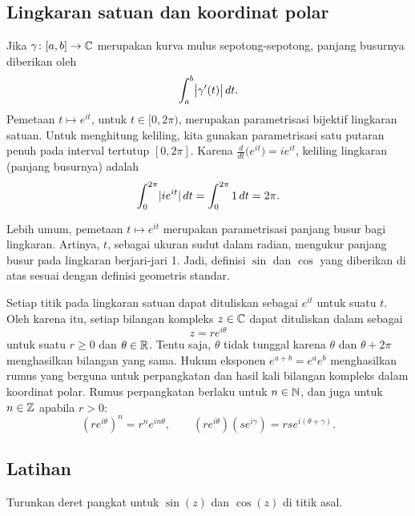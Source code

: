 \subsection{Lingkaran satuan dan koordinat polar}

Jika $\gamma \colon [a,b] \to {\mathbb{C}}$ merupakan kurva mulus sepotong-sepotong,
panjang busurnya diberikan oleh
\begin{equation*}
\int_a^b \bigl\lvert {\gamma'(t)} \bigr\rvert \, dt .
\end{equation*}
Pemetaan $t \mapsto e^{it}$, untuk $t \in [0,2\pi)$, merupakan parametrisasi
bijektif lingkaran satuan. Untuk menghitung keliling, kita gunakan parametrisasi
satu putaran penuh pada interval tertutup $[0,2\pi]$. Karena
$\frac{d}{dt} \bigl( e^{it} \bigr) = ie^{it}$, keliling
lingkaran (panjang busurnya) adalah
\begin{equation*}
\int_0^{2\pi} \lvert {i e^{it}} \rvert  \,  dt
=
\int_0^{2\pi} 1  \,  dt  = 2\pi .
\end{equation*}

Lebih umum, pemetaan $t \mapsto e^{it}$ merupakan parametrisasi panjang busur bagi lingkaran.
Artinya, $t$, sebagai ukuran sudut dalam radian, mengukur panjang busur pada
lingkaran berjari-jari 1. Jadi, definisi $\sin$ dan $\cos$ yang diberikan
di atas sesuai dengan definisi geometris standar.

Setiap titik pada lingkaran satuan dapat dituliskan sebagai $e^{it}$ untuk suatu $t$.
Oleh karena itu, setiap bilangan kompleks $z \in {\mathbb{C}}$ dapat dituliskan dalam
\emph{} sebagai
\begin{equation*}
z = r e^{i\theta}
\end{equation*}
untuk suatu $r \geq 0$ dan $\theta \in {\mathbb{R}}$. Tentu saja, $\theta$
tidak tunggal karena $\theta$ dan $\theta+2\pi$ menghasilkan bilangan yang sama.
Hukum eksponen $e^{a+b} = e^a e^b$ menghasilkan rumus yang berguna untuk perpangkatan
dan hasil kali bilangan kompleks dalam koordinat polar. Rumus perpangkatan berlaku untuk
$n \in {\mathbb{N}}$, dan juga untuk $n \in {\mathbb{Z}}$ apabila $r > 0$:
\begin{equation*}
{(r e^{i\theta})}^n
= r^n e^{i n \theta} ,
\qquad
(r e^{i\theta})
(s e^{i\gamma})
=
rs e^{i(\theta+\gamma)} .
\end{equation*}

\subsection{Latihan}

\begin{exercise}
Turunkan deret pangkat untuk $\sin(z)$ dan $\cos(z)$ di titik asal.
\end{exercise}

